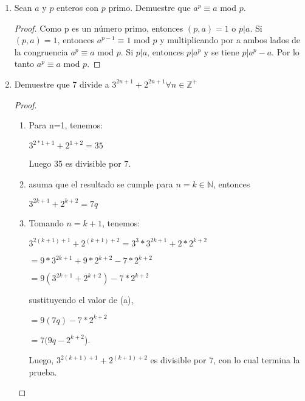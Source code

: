 \documentclass{article}
\theoremstyle{break}
\begin{document}
\begin{enumerate}
\begin{proof}
		\end{proof}
		
		
		\item Sean $a$ y $p$ enteros con $p$ primo. Demuestre que $a^p \equiv a$ mod $p$.
		
			\begin{proof}
			Como p es un n\'umero primo, entonces $(p,a)=1$ o $p|a$. Si $(p,a)=1$, entonces $a^{p-1}\equiv 1$ mod $p$ y multiplicando por a ambos lados de la congruencia $a^p \equiv a$ mod $p$. Si $p|a$, entonces $p|a^p$ y se tiene $p|a^p-a$. Por lo tanto $a^p \equiv a$ mod $p$.
		
		\end{proof}
		
		
		\item Demuestre que 7 divide a $3^{2n+1}+2^{2n+1} \forall n\in\mathbb{Z}^{+}$
		
		\begin{proof}
		\begin{enumerate}
			\item Para n=1, tenemos:
			
			\begin{center}
				$3^{2\ast1+1}+2^{1+2}=35$
			\end{center}
			Luego 35 es divisible por 7.
			
			\item asuma que el resultado se cumple para $n=k \in\mathbb{N}$, entonces
			
			\begin{center}
				$3^{2k+1}+2^{k+2}=7q$
			\end{center}
			
			\item Tomando $n=k+1$, tenemos:
			
			\begin{center}
				$3^{2(k+1)+1}+2^{(k+1)+2}=3^3\ast3^{2k+1}+2\ast2^{k+2}$
				
				$=9\ast 3^{2k+1}+9\ast 2^{k+2}-7\ast 2^{k+2}$
				
				$=9(3^{2k+1}+2^{k+2})-7\ast 2^{k+2}$
				
			\end{center}
			sustituyendo el valor de (a),
			
			\begin{center}
				$=9(7q)-7\ast 2^{k+2}$
				
				$=7(9q-2^{k+2}$).
			\end{center}
			
			Luego, $3^{2(k+1)+1}+2^{(k+1)+2}$ es divisible por 7, con lo cual termina la prueba.
		\end{enumerate}
		

\end{proof}
\end{enumerate}
\end{document}
